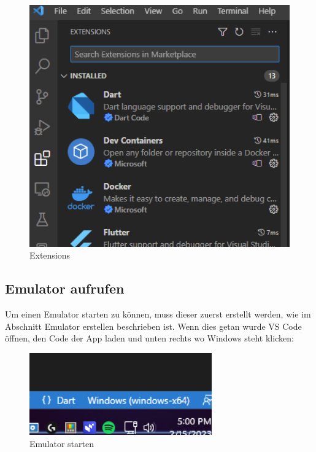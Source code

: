 \begin{figure}[!h]
\centering
\vspace{0.5cm}
\includegraphics[width=1\textwidth]{FLUTTER/images/ZB/vscode_extensions.png}
\caption{Extensions}
\end{figure}

\newpage

\subsection{Emulator aufrufen}
Um einen Emulator starten zu können, muss dieser zuerst erstellt werden, wie im Abschnitt Emulator erstellen beschrieben ist. Wenn dies getan wurde VS Code öffnen, den Code der App laden und unten rechts wo Windows steht klicken:

\begin{figure}[!h]
\centering
\vspace{0.5cm}
\includegraphics[width=0.7\textwidth]{FLUTTER/images/ZB/emulator_selector.png}
\caption{Emulator starten}
\end{figure}

